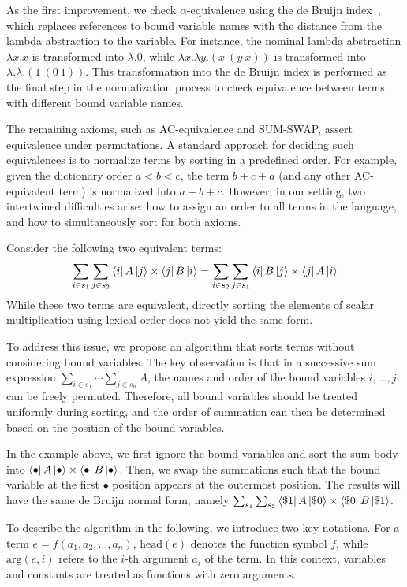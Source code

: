 \documentclass[runningheads]{llncs}
\begin{document}
As the first improvement, we check \( \alpha \)-equivalence using the de Bruijn index~\cite{deBruijn1972lambda}, which replaces references to bound variable names with the distance from the lambda abstraction to the variable. For instance, the nominal lambda abstraction \( \lambda x. x \) is transformed into \( \lambda . 0 \), while \( \lambda x. \lambda y. (x\ (y\ x)) \) is transformed into \( \lambda.\lambda. (1\ (0\ 1)) \). This transformation into the de Bruijn index is performed as the final step in the normalization process to check equivalence between terms with different bound variable names.

The remaining axioms, such as AC-equivalence and SUM-SWAP, assert equivalence under permutations. A standard approach for deciding such equivalences is to normalize terms by sorting in a predefined order. For example, given the dictionary order \( a < b < c \), the term \( b + c + a \) (and any other AC-equivalent term) is normalized into \( a + b + c \). However, in our setting, two intertwined difficulties arise: how to assign an order to all terms in the language, and how to simultaneously sort for both axioms.

Consider the following two equivalent terms:
\[
\sum_{i \in s_1} \sum_{j \in s_2} \bra{i} A \ket{j} \times \bra{j} B \ket{i}
= 
\sum_{i \in s_2} \sum_{j \in s_1} \bra{i} B \ket{j} \times \bra{j} A \ket{i}
\]
While these two terms are equivalent, directly sorting the elements of scalar multiplication using lexical order does not yield the same form.

To address this issue, we propose an algorithm that sorts terms without considering bound variables. The key observation is that in a successive sum expression \( \sum_{i \in s_1} \cdots \sum_{j \in s_n} A \), the names and order of the bound variables \( i, \dots, j \) can be freely permuted. Therefore, all bound variables should be treated uniformly during sorting, and the order of summation can then be determined based on the position of the bound variables.

In the example above, we first ignore the bound variables and sort the sum body into \( \bra{\bullet} A \ket{\bullet} \times \bra{\bullet} B \ket{\bullet} \). Then, we swap the summations such that the bound variable at the first \( \bullet \) position appears at the outermost position. The results will have the same de Bruijn normal form, namely \( \sum_{s_1} \sum_{s_2} \bra{\$1} A \ket{\$0} \times \bra{\$0} B \ket{\$1} \).


To describe the algorithm in the following, we introduce two key notations. For a term \( e = f(a_1, a_2, \dots, a_n) \), \( \textrm{head}(e) \) denotes the function symbol \( f \), while \( \textrm{arg}(e, i) \) refers to the \( i \)-th argument \( a_i \) of the term. In this context, variables and constants are treated as functions with zero arguments.
\end{document}
